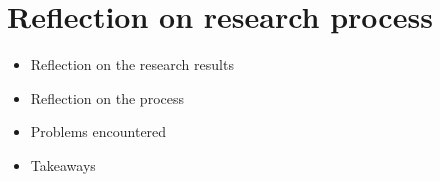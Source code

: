 \chapter*{Reflection on research process}\label{reflection}

\begin{itemize}
    \item Reflection on the research results
    \item Reflection on the process
    \item Problems encountered
    \item Takeaways 
\end{itemize}